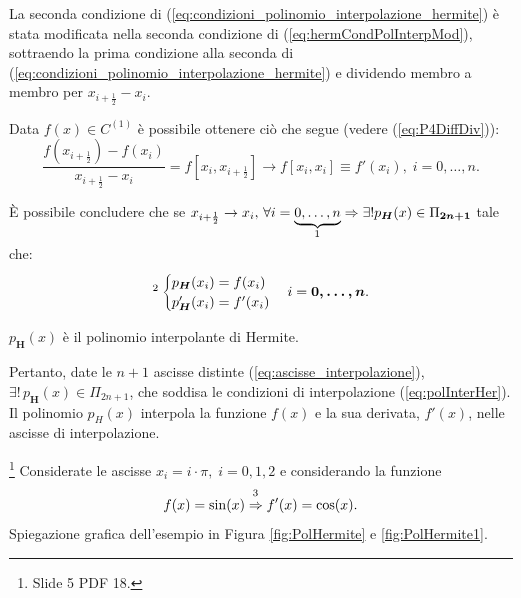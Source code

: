 \begin{remark}
    La seconda condizione di (\ref{eq:condizioni_polinomio_interpolazione_hermite}) è stata modificata nella seconda condizione di (\ref{eq:hermCondPolInterpMod}), sottraendo la prima condizione alla seconda di (\ref{eq:condizioni_polinomio_interpolazione_hermite}) e dividendo membro a membro per $x_{i+\frac{1}{2}}-x_i$.
\end{remark}

Data $f(x)\in C^{(1)}$ è possibile ottenere ciò che segue (vedere (\ref{eq:P4DiffDiv})):
\begin{equation}\label{eq:equivApproxf'}
    \frac{f\left(x_{i+\frac{1}{2}}\right)-f(x_i)}{x_{i+\frac{1}{2}}-x_i}=f\left[x_i,x_{i+\frac{1}{2}}\right]\rightarrow f[x_i,x_i]\equiv f'(x_i),\; i=0,\hdots,n.
\end{equation}

È possibile concludere che se $x_{i+\frac{1}{2}}\rightarrow x_i,\, \forall i=\underbrace{0,\hdots, n}_{\footnotemark}\Rightarrow\exists! p_{\boldsymbol H}(x)\in\Pi_{\boldsymbol{2n+1}}$ tale che: 
\begin{equation}\label{eq:polInterHer}
    \footnotemark\begin{cases}
        p_{\boldsymbol H}(x_i)=f(x_i)\\
        p_{\boldsymbol H}'(x_i)=f'(x_i)
    \end{cases} i=\boldsymbol{0,\hdots,n}.
\end{equation}

\begin{definition}
    $p_{\boldsymbol H}(x)$ è il polinomio interpolante di Hermite.  
\end{definition}

Pertanto, date le $n+1$ ascisse distinte (\ref{eq:ascisse_interpolazione}), $\exists!\, p_{\boldsymbol H}(x)\in\Pi_{2n+1}$, che soddisa le condizioni di interpolazione (\ref{eq:polInterHer}). Il polinomio $p_H(x)$ interpola la funzione $f(x)$ e la sua derivata, $f'(x)$, nelle ascisse di interpolazione.

\begin{example}\footnote{Slide 5 PDF 18.}
    Considerate le ascisse $x_i=i\cdot\pi,\; i=0,1,2$ e considerando la funzione
    \begin{equation*}
        f(x)=\sin(x)\overset{\footnotemark}{\Rightarrow}f'(x)=\cos(x).
    \end{equation*}
    Spiegazione grafica dell'esempio in Figura \ref{fig:PolHermite} e \ref{fig:PolHermite1}. 
\end{example}

